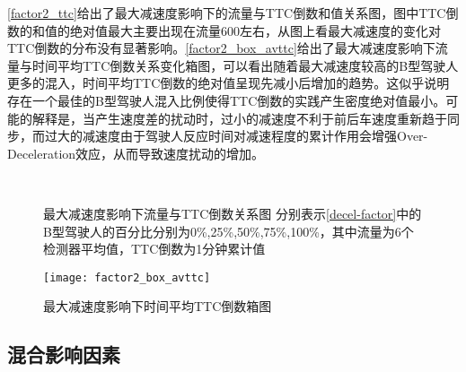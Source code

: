 \autoref{factor2_ttc}给出了最大减速度影响下的流量与TTC倒数和值关系图，图中TTC倒数的和值的绝对值最大主要出现在流量600左右，从图上看最大减速度的变化对TTC倒数的分布没有显著影响。\autoref{factor2_box_avttc}给出了最大减速度影响下流量与时间平均TTC倒数关系变化箱图，可以看出随着最大减速度较高的B型驾驶人更多的混入，时间平均TTC倒数的绝对值呈现先减小后增加的趋势。这似乎说明存在一个最佳的B型驾驶人混入比例使得TTC倒数的实践产生密度绝对值最小。可能的解释是，当产生速度差的扰动时，过小的减速度不利于前后车速度重新趋于同步，而过大的减速度由于驾驶人反应时间对减速程度的累计作用会增强Over-Deceleration效应，从而导致速度扰动的增加。
\begin{figure}[htb]%
\centering
{}%
\\%
%
\caption[A set of four sub-floats.]{最大减速度影响下流量与TTC倒数关系图
分别表示\autoref{decel-factor}中的B型驾驶人的百分比分别为0\%,25\%,50\%,75\%,100\%，其中流量为6个检测器平均值，TTC倒数为1分钟累计值}%
\label{factor2_ttc}%
\end{figure}

\begin{figure}[htb]
\begin{center}
\texttt{[image: factor2\_box\_avttc]}
\caption{最大减速度影响下时间平均TTC倒数箱图}
\label{factor2_box_avttc}
\end{center}
\end{figure}

\FloatBarrier

\subsection{混合影响因素}

